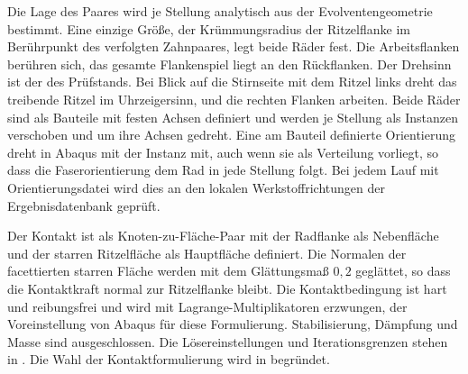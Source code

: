 
Die Lage des Paares wird je Stellung analytisch aus der Evolventengeometrie bestimmt. Eine einzige Größe, der Krümmungsradius der Ritzelflanke im Berührpunkt des verfolgten Zahnpaares, legt beide Räder fest. Die Arbeitsflanken berühren sich, das gesamte Flankenspiel liegt an den Rückflanken. Der Drehsinn ist der des Prüfstands. Bei Blick auf die Stirnseite mit dem Ritzel links dreht das treibende Ritzel im Uhrzeigersinn, und die rechten Flanken arbeiten. Beide Räder sind als Bauteile mit festen Achsen definiert und werden je Stellung als Instanzen verschoben und um ihre Achsen gedreht. Eine am Bauteil definierte Orientierung dreht in Abaqus mit der Instanz mit, auch wenn sie als Verteilung vorliegt, so dass die Faserorientierung dem Rad in jede Stellung folgt. Bei jedem Lauf mit Orientierungsdatei wird dies an den lokalen Werkstoffrichtungen der Ergebnisdatenbank geprüft.

Der Kontakt ist als Knoten-zu-Fläche-Paar mit der Radflanke als Nebenfläche und der starren Ritzelfläche als Hauptfläche definiert. Die Normalen der facettierten starren Fläche werden mit dem Glättungsmaß $0{,}2$ geglättet, so dass die Kontaktkraft normal zur Ritzelflanke bleibt. Die Kontaktbedingung ist hart und reibungsfrei und wird mit Lagrange-Multiplikatoren erzwungen, der Voreinstellung von Abaqus für diese Formulierung. Stabilisierung, Dämpfung und Masse sind ausgeschlossen. Die Lösereinstellungen und Iterationsgrenzen stehen in . Die Wahl der Kontaktformulierung wird in  begründet.


